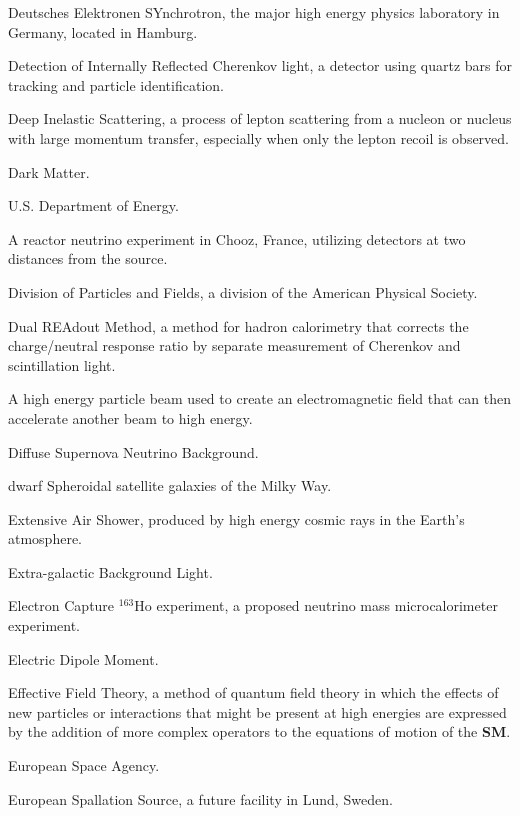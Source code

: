  Deutsches Elektronen SYnchrotron, the major
high energy physics laboratory in Germany, located in Hamburg.

 Detection of Internally Reflected Cherenkov light,
a detector using quartz bars for tracking and particle identification.
 
 Deep Inelastic Scattering, a process of lepton scattering
from a nucleon or nucleus with large momentum transfer, especially when
only the lepton recoil is observed.

  Dark Matter.

 U.S. Department of Energy.

 A reactor neutrino experiment in Chooz,
France, utilizing detectors at two distances 
from the source.

 Division of Particles and Fields, a division of the 
American Physical Society.

 Dual REAdout Method, a method for hadron 
calorimetry that corrects the charge/neutral response ratio by 
separate measurement of Cherenkov and scintillation light.


   A high energy particle beam used to 
 create an electromagnetic  field that can then accelerate another
beam to high energy.

 Diffuse Supernova Neutrino Background.


  dwarf Spheroidal satellite galaxies of the Milky Way.


  Extensive Air Shower, produced by high energy cosmic rays in the
Earth's atmosphere.

  Extra-galactic Background Light.

 Electron Capture $^{163}$Ho experiment, 
a proposed neutrino mass microcalorimeter experiment.

  Electric Dipole Moment.

 Effective Field Theory, a method of quantum field
theory in which the effects of new particles or interactions that
might be present at high energies are expressed by the addition of 
more complex operators to the equations of motion of the {\bf SM}.


  European Space Agency.

 European Spallation Source, a future facility in
Lund, Sweden.


